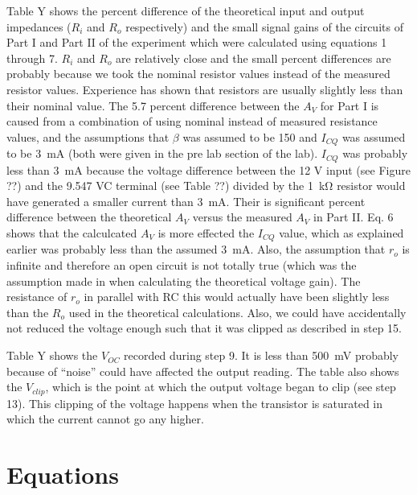 Table Y shows the percent difference of the theoretical input and output impedances ($R_i$ and $R_o$ respectively) and the small signal gains of the circuits of Part I and Part II of the experiment which were calculated using equations 1 through 7. $R_i$ and $R_o$ are relatively close and the small percent differences are probably because we took the nominal resistor values instead of the measured resistor values. Experience has shown that resistors are usually slightly less than their nominal value. The 5.7 percent difference between the $A_V$ for Part I is caused from a combination of using nominal instead of measured resistance values, and the assumptions that $\beta$ was assumed to be 150 and  $I_{CQ}$ was assumed to be \SI{3}{mA} (both were given in the pre lab section of the lab). $I_{CQ}$ was probably less than \SI{3}{mA} because the voltage difference between the 12 V input (see Figure ??) and the 9.547 VC terminal (see Table ??) divided by the \SI{1}{\kilo\ohm} resistor would have generated a smaller current than \SI{3}{mA}. Their is significant percent difference between the theoretical $A_V$ versus the measured $A_V$ in Part II. Eq. 6 shows that the calculcated $A_V$ is more effected the $I_{CQ}$ value, which as explained earlier was probably less than the assumed \SI{3}{mA}. Also, the assumption that $r_o$ is infinite and therefore an open circuit is not totally true (which was the assumption made in when calculating the theoretical voltage gain). The resistance of $r_o$ in parallel with RC this would actually have been slightly less than the $R_o$ used in the theoretical calculations. Also, we could have accidentally not reduced the voltage enough such that it was clipped as described in step 15.

Table Y shows the $V_{OC}$ recorded during step 9. It is less than \SI{500}{mV} probably because of “noise” could have affected the output reading. The table also shows the $V_{clip}$, which is the point at which the output voltage began to clip (see step 13). This clipping of the voltage happens when the transistor is saturated in which the current cannot go any higher.

\section{Equations}

%
%


